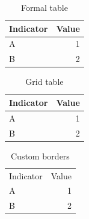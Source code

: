 \documentclass{article}
\begin{document}
\begin{table}[htbp]
\centering
\caption{Formal table}
\begin{tabular}{lr}
\toprule
Indicator & Value \\
\midrule
A & 1 \\
B & 2 \\
\bottomrule
\end{tabular}
\end{table}

\begin{table}[htbp]
\centering
\caption{Grid table}
\begin{tabular}{|l|r|}
\hline
Indicator & Value \\
\hline
A & 1 \\
\hline
B & 2 \\
\hline
\end{tabular}
\end{table}

\begin{table}[htbp]
\centering
\caption{Custom borders}
\begin{tabular}{|l|r}
\hline
Indicator & Value \\
A & 1 \\
B & 2 \\
\hline
\end{tabular}
\end{table}
\end{document}
